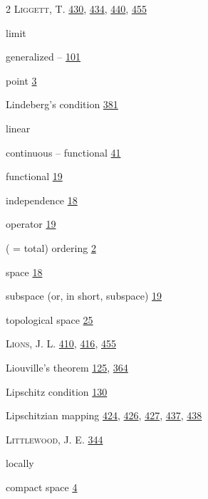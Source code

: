 \begin{multicols}{2}
\noindent \textsc{Liggett}, T. \hyperlink{page.430}{430}, \hyperlink{page.434}{434}, \hyperlink{page.440}{440}, \hyperlink{page.455}{455}\par
\noindent limit\par
\hspace*{1.1em}generalized -- \hyperlink{page.101}{101}\par
\hspace*{1.1em}point \hyperlink{page.3}{3}\par
\noindent Lindeberg's condition \hyperlink{page.381}{381}\par
\noindent linear\par
\hspace*{1.1em}continuous -- functional \hyperlink{page.41}{41}\par
\hspace*{1.1em}functional \hyperlink{page.19}{19}\par
\hspace*{1.1em}independence \hyperlink{page.18}{18}\par
\hspace*{1.1em}operator \hyperlink{page.19}{19}\par
\hspace*{1.1em}( = total) ordering \hyperlink{page.2}{2}\par
\hspace*{1.1em}space \hyperlink{page.18}{18}\par
\hspace*{1.1em}subspace (or, in short, subspace) \hyperlink{page.19}{19}\par
\hspace*{1.1em}topological space \hyperlink{page.25}{25}\par
\noindent \textsc{Lions}, J. L. \hyperlink{page.410}{410}, \hyperlink{page.416}{416}, \hyperlink{page.455}{455}\par
\noindent Liouville's theorem \hyperlink{page.125}{125}, \hyperlink{page.364}{364}\par
\noindent Lipschitz condition \hyperlink{page.130}{130}\par
\noindent Lipschitzian mapping \hyperlink{page.424}{424}, \hyperlink{page.426}{426}, \hyperlink{page.427}{427}, \hyperlink{page.437}{437}, \hyperlink{page.438}{438}\par
\noindent \textsc{Littlewood}, J. E. \hyperlink{page.344}{344}\par
\noindent locally\par
\hspace*{1.1em}compact space \hyperlink{page.4}{4}\par

\end{multicols}
